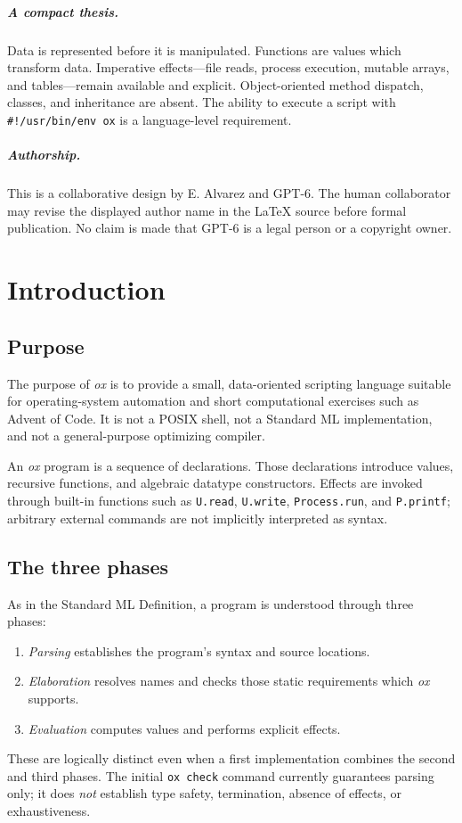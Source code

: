 \documentclass[11pt,oneside,openany]{book}
\newcommand{\ox}{\textit{ox}}
\newcommand{\kw}[1]{\texttt{#1}}
\begin{document}
\paragraph{A compact thesis.} Data is represented before it is manipulated. Functions are values which transform data. Imperative effects---file reads, process execution, mutable arrays, and tables---remain available and explicit. Object-oriented method dispatch, classes, and inheritance are absent. The ability to execute a script with \texttt{\#!/usr/bin/env ox} is a language-level requirement.

\paragraph{Authorship.} This is a collaborative design by E. Alvarez and GPT-6. The human collaborator may revise the displayed author name in the LaTeX source before formal publication. No claim is made that GPT-6 is a legal person or a copyright owner.

\tableofcontents
\clearpage
\mainmatter

\chapter{Introduction}
\section{Purpose}
The purpose of \ox{} is to provide a small, data-oriented scripting language suitable for operating-system automation and short computational exercises such as Advent of Code. It is not a POSIX shell, not a Standard ML implementation, and not a general-purpose optimizing compiler.

An \ox{} program is a sequence of declarations. Those declarations introduce values, recursive functions, and algebraic datatype constructors. Effects are invoked through built-in functions such as \kw{U.read}, \kw{U.write}, \kw{Process.run}, and \kw{P.printf}; arbitrary external commands are not implicitly interpreted as syntax.

\section{The three phases}
As in the Standard ML Definition, a program is understood through three phases:
\begin{enumerate}
\item \emph{Parsing} establishes the program's syntax and source locations.
\item \emph{Elaboration} resolves names and checks those static requirements which \ox{} supports.
\item \emph{Evaluation} computes values and performs explicit effects.
\end{enumerate}
These are logically distinct even when a first implementation combines the second and third phases. The initial \kw{ox check} command currently guarantees parsing only; it does \emph{not} establish type safety, termination, absence of effects, or exhaustiveness.
\end{document}
